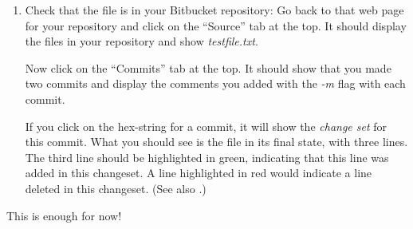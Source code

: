 \documentclass[letterpaper,10pt,english]{sphinxmanual}
\def\PYGZdl{\char`\$}
\def\PYGZhy{\char`\-}
\begin{document}
\begin{enumerate}
Not only has it copied the 1 file over, it has added both changesets, so
the entire history of your commits is now stored in the repository.  If
someone else clones the repository, they get the entire commit history
and could revert to any previous version, for example.

To push future commits to bitbucket, you should only need to do:

\begin{Verbatim}[commandchars=\\\{\}]
\PYGZdl{} git push
\end{Verbatim}

and by default it will push your master branch (the only branch you
have, probably) to , which is the shorthand name for the
place you originally cloned the repository from.  To see where this
actually points to:

\begin{Verbatim}[commandchars=\\\{\}]
\PYGZdl{} git remote \PYGZhy{}v
\end{Verbatim}

This lists all .
By default there is only one, the place you cloned the repository from.
(Or none if you had created a new repository using  rather
than cloning an existing one.)

\item {} 
Check that the file is in your Bitbucket repository:  Go back to that web
page for your repository and click on the  ``Source'' tab at the top.  It
should display the files in your repository and show \emph{testfile.txt}.

Now click on the ``Commits'' tab at the top.  It should show that you
made two commits and display the comments you added with the \emph{-m} flag
with each commit.

If you click on the hex-string for a commit, it will show the
\emph{change set} for this commit.  What you
should see is the file in its final state, with three lines.  The third
line should be highlighted in green, indicating that this line was added
in this changeset.  A line highlighted in red would indicate a line deleted
in this changeset.  (See also {\hyperref[bitbucket:bitbucket]{}}.)

\end{enumerate}

This is enough for now!
\end{document}
